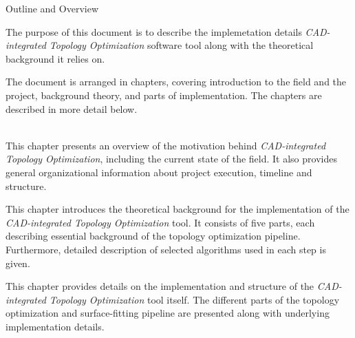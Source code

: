 \clearemptydoublepage

{}

\begin{center}
	\huge{Outline and Overview}
\end{center}




The purpose of this document is to describe the implemetation details \emph{CAD-integrated Topology Optimization} software tool along with the theoretical background it relies on.
%

The document is arranged in chapters, covering introduction to the field and the project, background theory, and parts of implementation. The chapters are described in more detail below.
\\
\\
  \vspace{1mm}

\noindent  This chapter presents an overview of the motivation behind \emph{CAD-integrated Topology Optimization}, including the current state of the field. It also provides general organizational information about project execution, timeline and structure.
 \\


  \vspace{1mm}

\noindent This chapter introduces the theoretical background for the implementation of the \emph{CAD-integrated Topology Optimization} tool. It consists of five parts, each describing essential background of the topology optimization pipeline. Furthermore, detailed description of selected algorithms used in each step is given.
\\

  \vspace{1mm}

\noindent This chapter provides details on the implementation and structure of the \emph{CAD-integrated Topology Optimization} tool itself. The different parts of the topology optimization and surface-fitting pipeline are presented along with underlying implementation details.
\\
